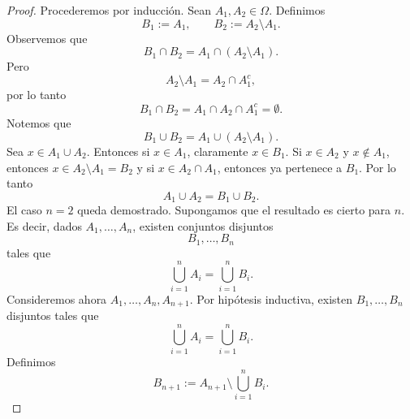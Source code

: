 \documentclass[12pt,a4paper]{article}
\begin{document}
    \begin{proof}
        Procederemos por inducción. Sean $A_{1},A_{2}\in\Omega$. Definimos
        \begin{equation*}
            B_{1}:=A_{1},\qquad B_{2}:=A_{2}\setminus A_{1}.
        \end{equation*}
        Observemos que
        \begin{equation*}
            B_{1}\cap B_{2}=A_{1}\cap(A_{2}\setminus A_{1}).
        \end{equation*}
        Pero
        \begin{equation*}
            A_{2}\setminus A_{1}=A_{2}\cap A_{1}^{c},
        \end{equation*}
        por lo tanto
        \begin{equation*}
            B_{1}\cap B_{2}=A_{1}\cap A_{2}\cap A_{1}^{c}=\emptyset.
        \end{equation*}
        Notemos que
        \begin{equation*}
            B_{1}\cup B_{2}=A_{1}\cup(A_{2}\setminus A_{1}).
        \end{equation*}
        Sea $x\in A_{1}\cup A_{2}$. Entonces si $x\in A_{1}$, claramente $x\in B_{1}$.
        Si $x\in A_{2}$ y $x \notin A_{1}$, entonces $x\in A_{2}\setminus A_{1}=B_{2}$ y
        si $x\in A_{2}\cap A_{1}$, entonces ya pertenece a $B_{1}$. Por lo tanto
        \begin{equation*}
            A_{1}\cup A_{2}=B_{1}\cup B_{2}.
        \end{equation*}
        El caso $n=2$ queda demostrado. Supongamos que el resultado es cierto para $n$.
        Es decir, dados $A_{1},\dots,A_{n}$, existen conjuntos disjuntos
        \begin{equation*}
            B_{1},\dots,B_{n}
        \end{equation*}
        tales que
        \begin{equation*}
            \bigcup_{i=1}^{n}A_{i}=\bigcup_{i=1}^{n}B_{i}.
        \end{equation*}
        Consideremos ahora $A_{1},\dots,A_{n},A_{n+1}$. Por hipótesis inductiva, existen
        $B_{1},\dots,B_{n}$ disjuntos tales que
        \begin{equation*}
            \bigcup_{i=1}^{n}A_{i}=\bigcup_{i=1}^{n}B_{i}.
        \end{equation*}
        Definimos
        \begin{equation*}
            B_{n+1}:=A_{n+1}\setminus\bigcup_{i=1}^{n}B_{i}.
        \end{equation*}

\end{proof}
\end{document}
